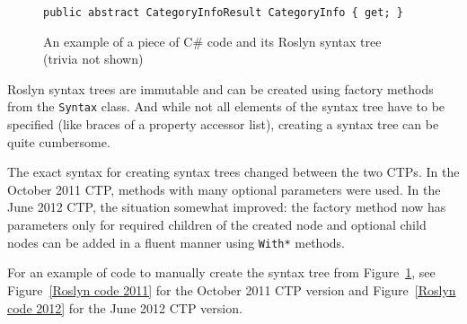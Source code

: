 \begin{figure}[htbp]

\begin{lstlisting}
public abstract CategoryInfoResult CategoryInfo { get; }
\end{lstlisting}

\begin{center}
\end{center}

\caption{An example of a piece of C\# code and its Roslyn syntax tree \\ (trivia not shown)}
\label{Syntax tree}
\end{figure}

\pagebreak[0]

Roslyn syntax trees are immutable and can be created using factory methods from the \lstinline{Syntax} class.
And while not all elements of the syntax tree have to be specified (like braces of a property accessor list),
creating a syntax tree can be quite cumbersome.

The exact syntax for creating syntax trees changed between the two CTPs.
In the October 2011 CTP, methods with many optional parameters were used.
In the June 2012 CTP, the situation somewhat improved:
the factory method now has parameters only for required children of the created node
and optional child nodes can be added in a fluent manner using \lstinline{With*} methods.

For an example of code to manually create the syntax tree from Figure~\ref{Syntax tree},
see Figure~\ref{Roslyn code 2011} for the October 2011 CTP version and
Figure~\ref{Roslyn code 2012} for the June 2012 CTP version.


